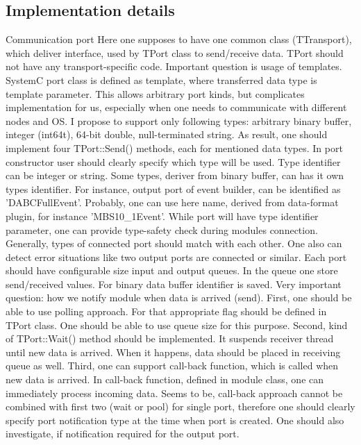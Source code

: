 \subsection{Implementation details}
Communication port 
Here one supposes to have one common class (TTransport), which deliver interface, used by TPort class to send/receive data. TPort should not have any transport-specific code. 
Important question is usage of templates. SystemC port class is defined as template, where transferred data type is template parameter. This allows arbitrary port kinds, but complicates implementation for us, especially when one needs to communicate with different nodes and OS. I propose to support only following types: arbitrary binary buffer, integer (int64t), 64-bit double, null-terminated string. As result, one should implement four TPort::Send() methods, each for mentioned data types. In port constructor user should clearly specify which type will be used. 
Type identifier can be integer or string. Some types, deriver from binary buffer, can has it own types identifier. For instance, output port of event builder, can be identified as 'DABCFullEvent'. Probably, one can use here name, derived from data-format plugin, for instance 'MBS10\_1Event'. 
While port will have type identifier parameter, one can provide type-safety check during modules connection. Generally, types of connected port should match with each other. One also can detect error situations like two output ports are connected or similar.
Each port should have configurable size input and output queues. In the queue one store send/received values. For binary data buffer identifier is saved. 
Very important question: how we notify module when data is arrived (send). First, one should be able to use polling approach. For that appropriate flag should be defined in TPort class. One should be able to use queue size for this purpose. Second, kind of TPort::Wait() method should be implemented. It suspends receiver thread until new data is arrived. When it happens, data should be placed in receiving queue as well. Third, one can support call-back function, which is called when new data is arrived. In call-back function, defined in module class, one can immediately process incoming data. 
Seems to be, call-back approach cannot be combined with first two (wait or pool) for single port, therefore one should clearly specify port notification type at the time when port is created. One should also investigate, if notification required for the output port. 

